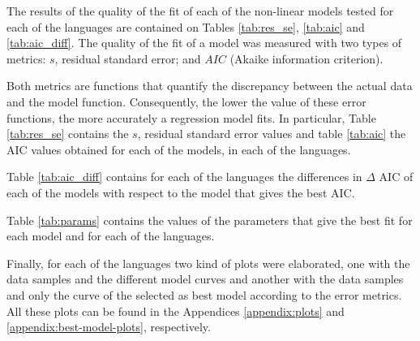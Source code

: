 
The results of the quality of the fit of each of the non-linear models tested for each of the languages are contained on Tables \ref{tab:res_se}, \ref{tab:aic} and \ref{tab:aic_diff}. The quality of the fit of a model was measured with two types of metrics: $s$, residual standard error; and $AIC$ (Akaike information criterion). 

Both metrics are functions that quantify the discrepancy between the actual data and the model function. Consequently, the lower the value of these error functions, the more accurately a regression model fits. In particular, Table \ref{tab:res_se} contains the $s$, residual standard error values and table \ref{tab:aic} the AIC values obtained for each of the models, in each of the languages.





Table \ref{tab:aic_diff} contains for each of the languages the differences in $\Delta$ AIC of each of the models with respect to the model that gives the best AIC.


Table \ref{tab:params} contains the values of the parameters that give the best fit for each model and for each of the languages. 


Finally, for each of the languages two kind of plots were elaborated, one with the data samples and the different model curves and another with the data samples and only the curve of the selected as best model according to the error metrics. All these plots can be found in the Appendices \ref{appendix:plots} and \ref{appendix:best-model-plots}, respectively.